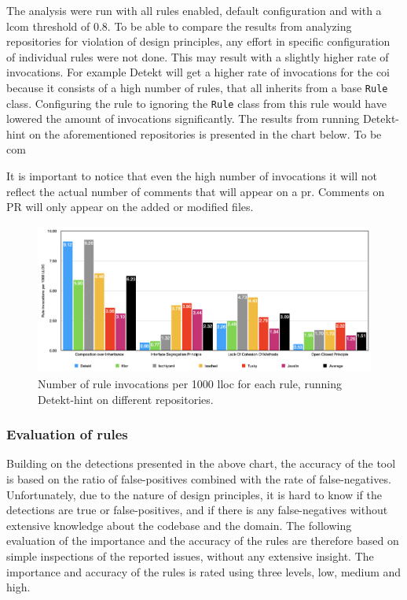 \documentclass{report}
\begin{document}
The analysis were run with all rules enabled, default configuration and with a \gls{lcom} threshold of 0.8. To be able to compare the results from analyzing repositories for violation of design principles, any effort in specific configuration of individual rules were not done. This may result with a slightly higher rate of invocations. For example Detekt will get a higher rate of invocations for the \gls{coi} because it consists of a high number of rules, that all inherits from a base \texttt{Rule} class. Configuring the rule to ignoring the \texttt{Rule} class from this rule would have lowered the amount of invocations significantly. The results from running Detekt-hint on the aforementioned repositories is presented in the chart below. To be com



It is important to notice that even the high number of invocations it will not reflect the actual number of comments that will appear on a \gls{pr}. Comments on PR will only appear on the added or modified files.


\begin{figure}[h!]
    \centering
    \includegraphics[width=\linewidth]{images/distribution.png}
    \caption{Number of rule invocations per 1000 \gls{lloc} for each rule, running Detekt-hint on different repositories. }
    \label{fig:distribution}
\end{figure}


\subsubsection{Evaluation of rules}
\label{rule-evaluation}
Building on the detections presented in the above chart, the accuracy of the tool is based on the ratio of false-positives combined with the rate of false-negatives. Unfortunately, due to the nature of design principles, it is hard to know if the detections are true or false-positives, and if there is any false-negatives without extensive knowledge about the codebase and the domain. The following evaluation of the importance and the accuracy of the rules are therefore based on simple inspections of the reported issues, without any extensive insight. The importance and accuracy of the rules is rated using three levels, low, medium and high.
\end{document}
